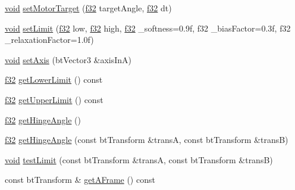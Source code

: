 \begin{DoxyCompactItemize}
\item 
\mbox{\hyperlink{_thread_8h_af1e856da2e658414cb2456cb6f7ebc66}{void}} \mbox{\hyperlink{classnjli_1_1_physics_constraint_hinge_a3d60c1cf68fb85d408d20bfcd49e5df5}{set\+Motor\+Target}} (\mbox{\hyperlink{_util_8h_a5f6906312a689f27d70e9d086649d3fd}{f32}} target\+Angle, \mbox{\hyperlink{_util_8h_a5f6906312a689f27d70e9d086649d3fd}{f32}} dt)
\item 
\mbox{\hyperlink{_thread_8h_af1e856da2e658414cb2456cb6f7ebc66}{void}} \mbox{\hyperlink{classnjli_1_1_physics_constraint_hinge_a658f010e5decd6e9dea4f239333c46de}{set\+Limit}} (\mbox{\hyperlink{_util_8h_a5f6906312a689f27d70e9d086649d3fd}{f32}} low, \mbox{\hyperlink{_util_8h_a5f6906312a689f27d70e9d086649d3fd}{f32}} high, \mbox{\hyperlink{_util_8h_a5f6906312a689f27d70e9d086649d3fd}{f32}} \+\_\+softness=0.\+9f, f32 \+\_\+bias\+Factor=0.\+3f, f32 \+\_\+relaxation\+Factor=1.\+0f)
\item 
\mbox{\hyperlink{_thread_8h_af1e856da2e658414cb2456cb6f7ebc66}{void}} \mbox{\hyperlink{classnjli_1_1_physics_constraint_hinge_ac29154620819b36709e15be9e11275db}{set\+Axis}} (bt\+Vector3 \&axis\+InA)
\item 
\mbox{\hyperlink{_util_8h_a5f6906312a689f27d70e9d086649d3fd}{f32}} \mbox{\hyperlink{classnjli_1_1_physics_constraint_hinge_a4df6c7953c16257d85669a7f7c786809}{get\+Lower\+Limit}} () const
\item 
\mbox{\hyperlink{_util_8h_a5f6906312a689f27d70e9d086649d3fd}{f32}} \mbox{\hyperlink{classnjli_1_1_physics_constraint_hinge_a5e2573f9accfd604270b48ee0b9e1cf4}{get\+Upper\+Limit}} () const
\item 
\mbox{\hyperlink{_util_8h_a5f6906312a689f27d70e9d086649d3fd}{f32}} \mbox{\hyperlink{classnjli_1_1_physics_constraint_hinge_a25fd1c88775b227aeda9b5f6aeae2a31}{get\+Hinge\+Angle}} ()
\item 
\mbox{\hyperlink{_util_8h_a5f6906312a689f27d70e9d086649d3fd}{f32}} \mbox{\hyperlink{classnjli_1_1_physics_constraint_hinge_a1cd6383e545ad3a933f4be9a2ffc7507}{get\+Hinge\+Angle}} (const bt\+Transform \&transA, const bt\+Transform \&transB)
\item 
\mbox{\hyperlink{_thread_8h_af1e856da2e658414cb2456cb6f7ebc66}{void}} \mbox{\hyperlink{classnjli_1_1_physics_constraint_hinge_a76aa725a1ea8033ca1ddd45ec1e30143}{test\+Limit}} (const bt\+Transform \&transA, const bt\+Transform \&transB)
\item 
const bt\+Transform \& \mbox{\hyperlink{classnjli_1_1_physics_constraint_hinge_a9693e745cfef0cc2616df93fbecd494f}{get\+A\+Frame}} () const

\end{DoxyCompactItemize}
